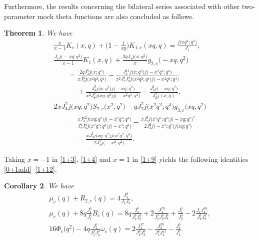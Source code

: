 \documentclass[10pt,a4paper]{amsart}
\numberwithin{equation}{section}
\newtheorem{Theorem}{Theorem}[section]
\newtheorem{Corollary}[Theorem]{Corollary}
\begin{document}
Furthermore, the results concerning the bilateral series associated with other two-parameter mock theta functions are also concluded as follows.
\begin{Theorem}\label{0+5}
We have
\begin{gather}
\frac{x}{x-1}K_c(x,q)+\bigg(1-\frac{1}{xq}\bigg)K_{1,c}(xq,q)
=\frac{j\bigl(xq^2;q^2\bigr)}{J_1},\label{1+3}\\
\frac{J_1j\bigl(-xq;q^2\bigr)}{x-1}K_{c}(x,q)
+\frac{2qJ_4j\bigl(x;q^2\bigr)}{x}g_{2,c}\bigl(-xq,q^2\bigr)\nonumber\\
\qquad=\frac{2qJ_4^5j\bigl(x;q^2\bigr)}{xJ_2^2 j\bigl(x^2q^2;q^4\bigr)}
-\frac{J_4^{11}j\bigl(x;q^2\bigr)j\bigl(-x^2q^2;q^4\bigr)}
{x^2J_2^4J_8^4j\bigl(x^2q^2;q^4\bigr)j\bigl(-x^2q^4;q^4\bigr)}\nonumber\\
\phantom{\qquad=}{}+\frac{J_4^5j\bigl(x;q^2\bigr)j\bigl(-xq;q^2\bigr)}
{x^2J_8^2j\bigl(xq;q^2\bigr)j\bigl(-x^2q^4;q^4\bigr)}
-\frac{J_1^5j\bigl(-xq;q^2\bigr)}{J_2^2j(x;q)},\label{1+4}\\
2xJ_4^2j\bigl(xq;q^2\bigr)S_{2,c}\bigl(x^2,q^2\bigr)-qJ_2^2j\bigl(x^2q^2;q^4\bigr)g_{3,c}\bigl(xq,q^2\bigr)\nonumber\\
\qquad=\frac{xJ_4^{12}j\bigl(xq;q^2\bigr)j\bigl(-x^2q^2;q^4\bigr)}{J_2^4J_8^4j\bigl(x^2q^2;q^4\bigr)j\bigl(-x^2;q^4\bigr)}
-\frac{xJ_2^5j\bigl(x^2q^2;q^4\bigr)j\bigl(-xq;q^2\bigr)^2}{2J_4^2j\bigl(-x^2;q^2\bigr)j\bigl(xq;q^2\bigr)}\nonumber\\
\phantom{\qquad=}{}-\frac{xJ_2^5j\bigl(xq;q^2\bigr)j\bigl(x^2q^2;q^4\bigr)}{2J_4^2j\bigl(-x^2;q^2\bigr)}.\label{1+9}
\end{gather}
\end{Theorem}

Taking $x=-1$ in \eqref{1+3}, \eqref{1+4} and $x=1$ in \eqref{1+9} yields the following identities \eqref{0+1add}--\eqref{1+12}.
\begin{Corollary}
We have
\begin{gather}
\mu_c(q)+R_{2,c}(q)=4\frac{J_4^2}{J_1J_2},\label{0+1add}\\
\mu_c(q)+8q\frac{J_4^3}{J_1^3}B_c(q)=8q\frac{J_4^8}{J_1^3J_2^4}
+2\frac{J_4^{20}}{J_1^3J_2^8J_8^8}+\frac{J_1^5}{J_2^4}
-2\frac{J_1J_4^{10}}{J_2^6J_8^4},\label{0+4}\\
16\varPhi_c\bigl(q^2\bigr)-4q\frac{J_2^5}{J_1^2J_4^3}\omega_c(q)
=2\frac{J_4^{17}}{J_2^8J_8^8}-\frac{J_2^{20}}{J_1^8J_4^{11}}
-\frac{J_2^8}{J_4^7}.\label{1+12}
\end{gather}
\end{Corollary}
\end{document}

